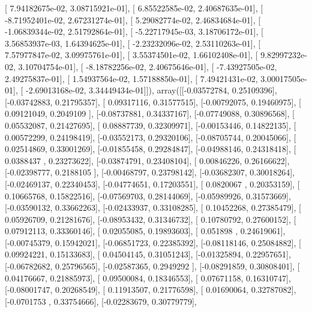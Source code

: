 \documentclass{article}
\begin{document}
       [  7.94182675e-02,   3.08715921e-01],
       [  6.85522585e-02,   2.40687635e-01],
       [ -8.71952401e-02,   2.67231274e-01],
       [  5.29082774e-02,   2.46834684e-01],
       [ -1.06839344e-02,   2.51792864e-01],
       [ -5.22717945e-03,   3.18706172e-01],
       [  3.56853937e-03,   1.64394625e-01],
       [ -2.23232096e-02,   2.53110263e-01],
       [  7.57977847e-02,   3.09975761e-01],
       [  3.55374501e-02,   1.66102408e-01],
       [  9.82997232e-02,   3.10704754e-01],
       [ -8.18782256e-02,   2.40675646e-01],
       [ -7.43927505e-02,   2.49275837e-01],
       [  1.54937564e-02,   1.57188850e-01],
       [  7.49421431e-02,   3.00017505e-01],
       [ -2.69013168e-02,   3.34449434e-01]]), array([[-0.03572784,  0.25109396],
       [-0.03742883,  0.21795357],
       [ 0.09317116,  0.31577515],
       [-0.00792075,  0.19460975],
       [ 0.09121049,  0.2049109 ],
       [-0.08737881,  0.34337167],
       [-0.07749088,  0.30896568],
       [ 0.05532087,  0.21427695],
       [ 0.08887739,  0.32309971],
       [-0.00153446,  0.14822135],
       [ 0.00572299,  0.24198419],
       [-0.03552173,  0.29320106],
       [-0.08705744,  0.20045066],
       [ 0.02514869,  0.33001269],
       [-0.01855458,  0.29284847],
       [-0.04988146,  0.24318418],
       [ 0.0388437 ,  0.23273622],
       [-0.03874791,  0.23408104],
       [ 0.00846226,  0.26166622],
       [-0.02398777,  0.2188105 ],
       [-0.00468797,  0.23798142],
       [-0.03682307,  0.30018264],
       [-0.02469137,  0.22340453],
       [-0.04774651,  0.17203551],
       [ 0.0820067 ,  0.20353159],
       [ 0.10665768,  0.15822516],
       [-0.07569703,  0.28144069],
       [-0.05989926,  0.31573669],
       [-0.03590132,  0.33662263],
       [-0.02433937,  0.33108285],
       [ 0.10452268,  0.27385479],
       [ 0.05926709,  0.21281676],
       [-0.08953432,  0.31346732],
       [ 0.10780792,  0.27600152],
       [ 0.07912113,  0.33360146],
       [ 0.02055085,  0.19893603],
       [ 0.051898  ,  0.24619061],
       [-0.00745379,  0.15942021],
       [-0.06851723,  0.22385392],
       [-0.08118146,  0.25084882],
       [ 0.09924221,  0.15133683],
       [ 0.04504145,  0.31051243],
       [-0.01325894,  0.22957651],
       [-0.06782682,  0.25796565],
       [-0.02587365,  0.2949292 ],
       [-0.08291859,  0.30808401],
       [ 0.04176667,  0.21885973],
       [ 0.09500084,  0.18346553],
       [ 0.07671158,  0.16310747],
       [-0.08001747,  0.20268549],
       [ 0.11913507,  0.21776598],
       [ 0.01690064,  0.32787082],
       [-0.0701753 ,  0.33754666],
       [-0.02283679,  0.30779779],
\end{document}
